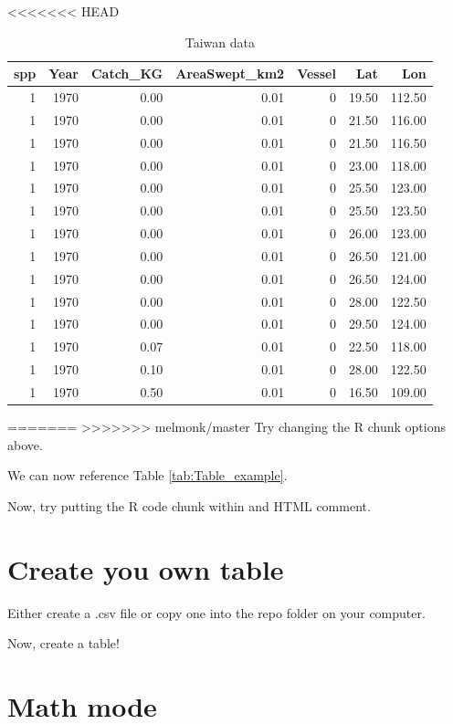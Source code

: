 \documentclass[12pt,]{article}
\begin{document}
<<<<<<< HEAD
\begin{table}[ht]
\centering
\caption{Taiwan data} 
\label{tab:Taiwan}
\begin{tabular}{rrrrrrr}
  \hline
spp & Year & Catch\_KG & AreaSwept\_km2 & Vessel & Lat & Lon \\ 
  \hline
  1 & 1970 & 0.00 & 0.01 &   0 & 19.50 & 112.50 \\ 
    1 & 1970 & 0.00 & 0.01 &   0 & 21.50 & 116.00 \\ 
    1 & 1970 & 0.00 & 0.01 &   0 & 21.50 & 116.50 \\ 
    1 & 1970 & 0.00 & 0.01 &   0 & 23.00 & 118.00 \\ 
    1 & 1970 & 0.00 & 0.01 &   0 & 25.50 & 123.00 \\ 
    1 & 1970 & 0.00 & 0.01 &   0 & 25.50 & 123.50 \\ 
    1 & 1970 & 0.00 & 0.01 &   0 & 26.00 & 123.00 \\ 
    1 & 1970 & 0.00 & 0.01 &   0 & 26.50 & 121.00 \\ 
    1 & 1970 & 0.00 & 0.01 &   0 & 26.50 & 124.00 \\ 
    1 & 1970 & 0.00 & 0.01 &   0 & 28.00 & 122.50 \\ 
    1 & 1970 & 0.00 & 0.01 &   0 & 29.50 & 124.00 \\ 
    1 & 1970 & 0.07 & 0.01 &   0 & 22.50 & 118.00 \\ 
    1 & 1970 & 0.10 & 0.01 &   0 & 28.00 & 122.50 \\ 
    1 & 1970 & 0.50 & 0.01 &   0 & 16.50 & 109.00 \\ 
   \hline
\end{tabular}
\end{table}

=======
>>>>>>> melmonk/master
Try changing the R chunk options above.

We can now reference Table \ref{tab:Table_example}.

Now, try putting the R code chunk within and HTML comment.

\section{Create you own table}\label{create-you-own-table}

Either create a .csv file or copy one into the repo folder on your
computer.

Now, create a table!

\section{Math mode}\label{math-mode}
\end{document}
